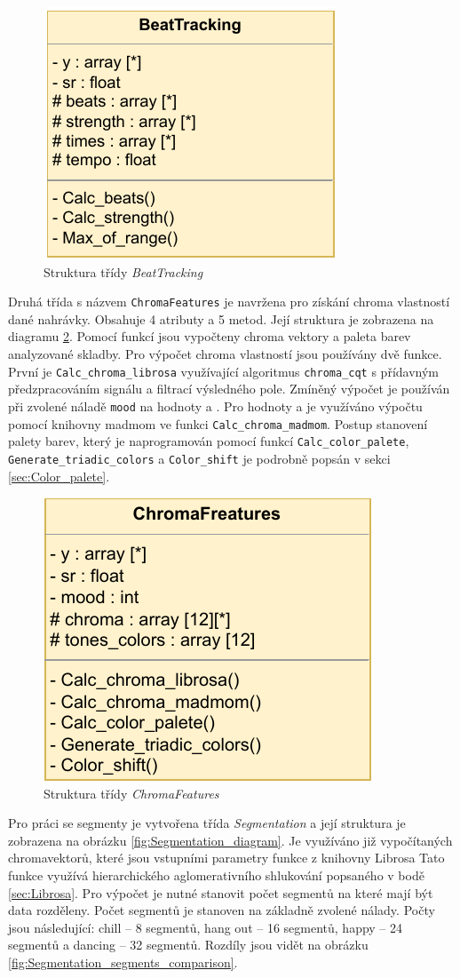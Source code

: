 \begin{figure}[H]
    \centering
        \includegraphics[width = 0.3\linewidth]{obrazky/UML_diagramy_BeatTracking.pdf}
        \caption{Struktura třídy \textit{BeatTracking}}
        \label{fig:BeatTracking_class_diagram}
\end{figure}

Druhá třída s názvem \texttt{ChromaFeatures} je navržena pro získání chroma vlastností dané nahrávky. Obsahuje 4 atributy a 5 metod. Její struktura je zobrazena na diagramu \ref{fig:ChromaFeatures_class_diagram}. Pomocí funkcí jsou vypočteny chroma vektory a paleta barev analyzované skladby. Pro výpočet chroma vlastností jsou používány dvě funkce. První je \texttt{Calc\_chroma\_librosa} využívající algoritmus \texttt{chroma\_cqt} s přídavným předzpracováním signálu a filtrací výsledného pole. Zmíněný výpočet je používán při zvolené náladě \texttt{mood} na hodnoty  a . Pro hodnoty  a  je využíváno výpočtu pomocí knihovny madmom ve funkci \texttt{Calc\_chroma\_madmom}. Postup stanovení palety barev, který je naprogramován pomocí funkcí \texttt{Calc\_color\_palete}, \texttt{Generate\_triadic\_colors} a \texttt{Color\_shift} je podrobně popsán v sekci \ref{sec:Color_palete}.

\begin{figure}[H]
    \centering
        \includegraphics[width = 0.3\linewidth]{obrazky/UML_diagram_ChromaFeatures.pdf}
        \caption{Struktura třídy \textit{ChromaFeatures}}
        \label{fig:ChromaFeatures_class_diagram}
\end{figure}

Pro práci se segmenty je vytvořena třída \textit{Segmentation} a její struktura je zobrazena na obrázku \ref{fig:Segmentation_diagram}. Je využíváno již vypočítaných chromavektorů, které jsou vstupními parametry funkce z knihovny Librosa Tato funkce využívá hierarchického aglomerativního shlukování popsaného v bodě \ref{sec:Librosa}. Pro výpočet je nutné stanovit počet segmentů na které mají být data rozděleny. Počet segmentů je stanoven na základně zvolené nálady. Počty jsou následující: chill -- 8 segmentů, hang out -- 16 segmentů, happy -- 24 segmentů a dancing -- 32 segmentů. Rozdíly jsou vidět na obrázku \ref{fig:Segmentation_segments_comparison}.

